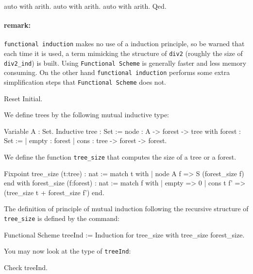 \begin{coq_example*}
\begin{coq_example*}
auto with arith.
auto with arith.
auto with arith.
Qed.
\end{coq_example*}

\paragraph{remark:} \texttt{functional induction} makes no use of
a induction principle, so be warned that each time it is used, a
term mimicking the structure of \texttt{div2} (roughly the size
of {\tt div2\_ind}) is built. Using \texttt{Functional Scheme} is
generally faster and less memory consuming.  On the other hand
\texttt{functional induction} performs some extra simplification
steps that \texttt{Functional Scheme} does not.




\begin{coq_eval}
Reset Initial.
\end{coq_eval}

We define trees by the following mutual inductive type:

\begin{coq_example*}
Variable A : Set.
Inductive tree : Set :=
    node : A -> forest -> tree
with forest : Set :=
  | empty : forest
  | cons : tree -> forest -> forest.
\end{coq_example*}

We define the function \texttt{tree\_size} that computes the size
of a tree or a forest.

\begin{coq_example*}                
Fixpoint tree_size (t:tree) : nat :=
  match t with
  | node A f => S (forest_size f)
  end
 with forest_size (f:forest) : nat :=
  match f with
  | empty => 0
  | cons t f' => (tree_size t + forest_size f')
  end.
\end{coq_example*}

The definition of principle of mutual induction following the
recursive structure of \texttt{tree\_size} is defined by the
command:

\begin{coq_example*}
Functional Scheme treeInd := Induction for tree_size
 with tree_size forest_size.
\end{coq_example*}

You may now look at the type of {\tt treeInd}:

\begin{coq_example}
Check treeInd.
\end{coq_example}




\end{coq_example*}
